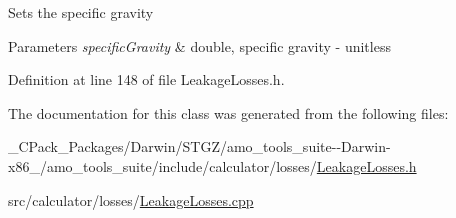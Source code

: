 Sets the specific gravity 
\begin{DoxyParams}{Parameters}
{\em specific\+Gravity} & double, specific gravity -\/ unitless \\
\hline
\end{DoxyParams}


Definition at line 148 of file Leakage\+Losses.\+h.



The documentation for this class was generated from the following files\+:\begin{DoxyCompactItemize}
\item 
\+\_\+\+C\+Pack\+\_\+\+Packages/\+Darwin/\+S\+T\+G\+Z/amo\+\_\+tools\+\_\+suite-\/-\/\+Darwin-\/x86\+\_/amo\+\_\+tools\+\_\+suite/include/calculator/losses/\hyperlink{___c_pack___packages_2_darwin_2_s_t_g_z_2amo__tools__suite--_darwin-x86__64_2amo__tools__suite_2eff36906b0118b933544333840dbb6dd}{Leakage\+Losses.\+h}\item 
src/calculator/losses/\hyperlink{_leakage_losses_8cpp}{Leakage\+Losses.\+cpp}\end{DoxyCompactItemize}
